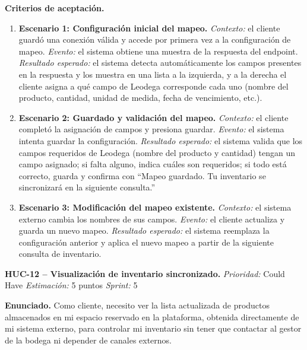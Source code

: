 \textbf{Criterios de aceptación.}
\begin{enumerate}
\item \textbf{Escenario 1: Configuración inicial del mapeo.} \textit{Contexto:} el cliente guardó una conexión válida y accede por primera vez a la configuración de mapeo. \textit{Evento:} el sistema obtiene una muestra de la respuesta del endpoint. \textit{Resultado esperado:} el sistema detecta automáticamente los campos presentes en la respuesta y los muestra en una lista a la izquierda, y a la derecha el cliente asigna a qué campo de Leodega corresponde cada uno (nombre del producto, cantidad, unidad de medida, fecha de vencimiento, etc.).
\item \textbf{Escenario 2: Guardado y validación del mapeo.} \textit{Contexto:} el cliente completó la asignación de campos y presiona guardar. \textit{Evento:} el sistema intenta guardar la configuración. \textit{Resultado esperado:} el sistema valida que los campos requeridos de Leodega (nombre del producto y cantidad) tengan un campo asignado; si falta alguno, indica cuáles son requeridos; si todo está correcto, guarda y confirma con ``Mapeo guardado. Tu inventario se sincronizará en la siguiente consulta.''
\item \textbf{Escenario 3: Modificación del mapeo existente.} \textit{Contexto:} el sistema externo cambia los nombres de sus campos. \textit{Evento:} el cliente actualiza y guarda un nuevo mapeo. \textit{Resultado esperado:} el sistema reemplaza la configuración anterior y aplica el nuevo mapeo a partir de la siguiente consulta de inventario.
\end{enumerate}

\textbf{HUC-12 -- Visualización de inventario sincronizado.} \label{req:HUC-12}
\textit{Prioridad:} Could Have \quad \textit{Estimación:} 5 puntos \quad \textit{Sprint:} 5

\textbf{Enunciado.} Como cliente, necesito ver la lista actualizada de productos almacenados en mi espacio reservado en la plataforma, obtenida directamente de mi sistema externo, para controlar mi inventario sin tener que contactar al gestor de la bodega ni depender de canales externos.

